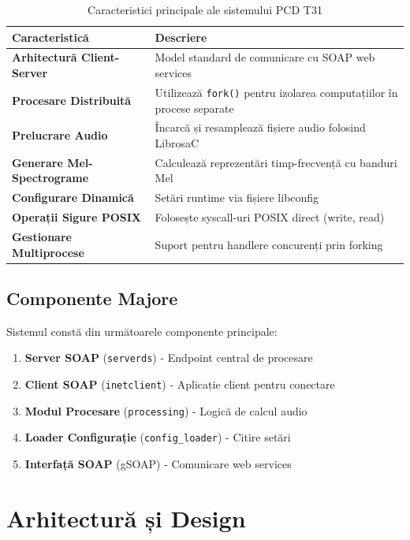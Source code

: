 \documentclass[12pt,a4paper,oneside]{book}
\begin{document}
\begin{table}[H]
\centering
\begin{tabularx}{\textwidth}{|l|X|}
\hline
\textbf{Caracteristică} & \textbf{Descriere} \\
\hline
\textbf{Arhitectură Client-Server} & Model standard de comunicare cu SOAP web services \\
\hline
\textbf{Procesare Distribuită} & Utilizează \texttt{fork()} pentru izolarea computațiilor în procese separate \\
\hline
\textbf{Prelucrare Audio} & Încarcă și resamplează fișiere audio folosind LibrosaC \\
\hline
\textbf{Generare Mel-Spectrograme} & Calculează reprezentări timp-frecvență cu banduri Mel \\
\hline
\textbf{Configurare Dinamică} & Setări runtime via fișiere libconfig \\
\hline
\textbf{Operații Sigure POSIX} & Folosește syscall-uri POSIX direct (write, read) \\
\hline
\textbf{Gestionare Multiprocese} & Suport pentru handlere concurenți prin forking \\
\hline
\end{tabularx}
\caption{Caracteristici principale ale sistemului PCD T31}
\end{table}

\section{Componente Majore}

Sistemul constă din următoarele componente principale:

\begin{enumerate}
    \item \textbf{Server SOAP} (\texttt{serverds}) - Endpoint central de procesare
    \item \textbf{Client SOAP} (\texttt{inetclient}) - Aplicație client pentru conectare
    \item \textbf{Modul Procesare} (\texttt{processing}) - Logică de calcul audio
    \item \textbf{Loader Configurație} (\texttt{config\_loader}) - Citire setări
    \item \textbf{Interfață SOAP} (gSOAP) - Comunicare web services
\end{enumerate}

\newpage

\chapter{Arhitectură și Design}
\end{document}
